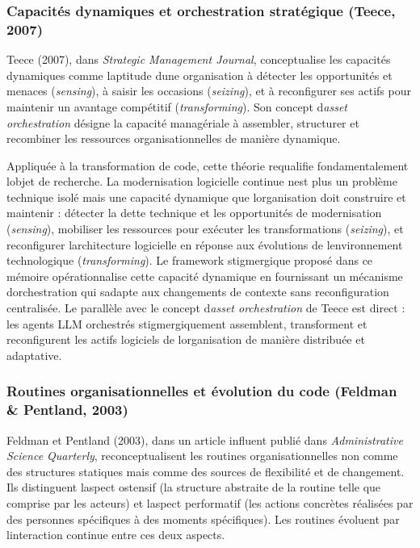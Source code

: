 \documentclass[12pt,a4paper]{article}
\begin{document}
\subsubsection{Capacités dynamiques et orchestration stratégique (Teece, 2007)}

Teece (2007), dans \emph{Strategic Management Journal}, conceptualise
les capacités dynamiques comme l\textquotesingle aptitude d\textquotesingle une
organisation à détecter les opportunités et menaces (\emph{sensing}),
à saisir les occasions (\emph{seizing}), et à reconfigurer ses actifs
pour maintenir un avantage compétitif (\emph{transforming}). Son concept
d\textquotesingle \emph{asset orchestration} désigne la capacité
managériale à assembler, structurer et recombiner les ressources
organisationnelles de manière dynamique.

Appliquée à la transformation de code, cette théorie requalifie
fondamentalement l\textquotesingle objet de recherche.
La modernisation logicielle continue n\textquotesingle est plus un
problème technique isolé mais une capacité dynamique que
l\textquotesingle organisation doit construire et maintenir : détecter
la dette technique et les opportunités de modernisation (\emph{sensing}),
mobiliser les ressources pour exécuter les transformations
(\emph{seizing}), et reconfigurer l\textquotesingle architecture
logicielle en réponse aux évolutions de l\textquotesingle environnement
technologique (\emph{transforming}). Le framework stigmergique proposé
dans ce mémoire opérationnalise cette capacité dynamique en fournissant
un mécanisme d\textquotesingle orchestration qui s\textquotesingle adapte
aux changements de contexte sans reconfiguration centralisée. Le
parallèle avec le concept d\textquotesingle \emph{asset orchestration}
de Teece est direct : les agents LLM orchestrés stigmergiquement
assemblent, transforment et reconfigurent les actifs logiciels de
l\textquotesingle organisation de manière distribuée et adaptative.

\subsubsection{Routines organisationnelles et évolution du code (Feldman \& Pentland, 2003)}

Feldman et Pentland (2003), dans un article influent publié dans
\emph{Administrative Science Quarterly}, reconceptualisent les routines
organisationnelles non comme des structures statiques mais comme des
sources de flexibilité et de changement. Ils distinguent
l\textquotesingle aspect ostensif (la structure abstraite de la routine
telle que comprise par les acteurs) et l\textquotesingle aspect
performatif (les actions concrètes réalisées par des personnes
spécifiques à des moments spécifiques). Les routines évoluent par
l\textquotesingle interaction continue entre ces deux aspects.
\end{document}
